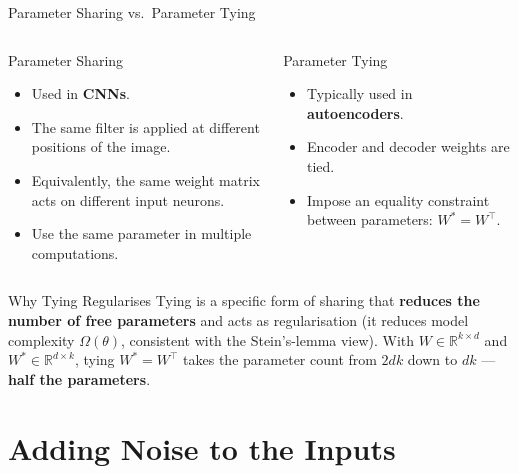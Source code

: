 \documentclass{beamer}
\begin{document}
\begin{frame}[shrink=10]{Parameter Sharing vs.\ Parameter Tying}
  \begin{columns}[T]
    \begin{block}{Parameter Sharing}
      \begin{itemize}\setlength\itemsep{2pt}
        \item Used in \textbf{CNNs}.
        \item The same filter is applied at different positions of the
              image.
        \item Equivalently, the same weight matrix acts on different input
              neurons.
        \item Use the same parameter in multiple computations.
      \end{itemize}
    \end{block}

    \begin{block}{Parameter Tying}
      \begin{itemize}\setlength\itemsep{2pt}
        \item Typically used in \textbf{autoencoders}.
        \item Encoder and decoder weights are tied.
        \item Impose an equality constraint between parameters:
              $W^{*} = W^{\top}$.
      \end{itemize}
    \end{block}
  \end{columns}

  \medskip

  \begin{block}{Why Tying Regularises}
    Tying is a specific form of sharing that \textbf{reduces the number of
    free parameters} and acts as regularisation (it reduces model
    complexity $\Omega(\theta)$, consistent with the Stein's-lemma view).
    With $W \in \mathbb{R}^{k\times d}$ and $W^{*}\in\mathbb{R}^{d\times k}$,
    tying $W^{*}=W^{\top}$ takes the parameter count from $2dk$ down to
    $dk$ --- \textbf{half the parameters}.
  \end{block}
\end{frame}

\section{Adding Noise to the Inputs}
\end{document}
